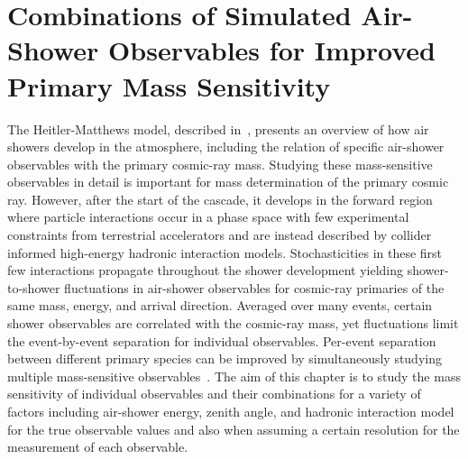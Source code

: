 %
%
\chapter{Combinations of Simulated Air-Shower Observables for Improved Primary Mass Sensitivity}\label{chap:simulations}

\begin{publishedin}
\pubsep
{}
\pubsep
{}
\end{publishedin}

The Heitler-Matthews model, described in~, presents an overview of how air showers develop in the atmosphere, including the relation of specific air-shower observables with the primary cosmic-ray mass.
Studying these mass-sensitive observables in detail is important for mass determination of the primary cosmic ray.
However, after the start of the cascade, it develops in the forward region where particle interactions occur in a phase space with few experimental constraints from terrestrial accelerators and are instead described by collider informed high-energy hadronic interaction models.
Stochasticities in these first few interactions propagate throughout the shower development yielding shower-to-shower fluctuations in air-shower observables for cosmic-ray primaries of the same mass, energy, and arrival direction.
Averaged over many events, certain shower observables are correlated with the cosmic-ray mass, yet fluctuations limit the event-by-event separation for individual observables.
Per-event separation between different primary species can be improved by simultaneously studying multiple mass-sensitive observables~\cite{holt_epjc2019_radiomuon}.
The aim of this chapter is to study the mass sensitivity of individual observables and their combinations for a variety of factors including air-shower energy, zenith angle, and hadronic interaction model for the true observable values and also when assuming a certain resolution for the measurement of each observable.

